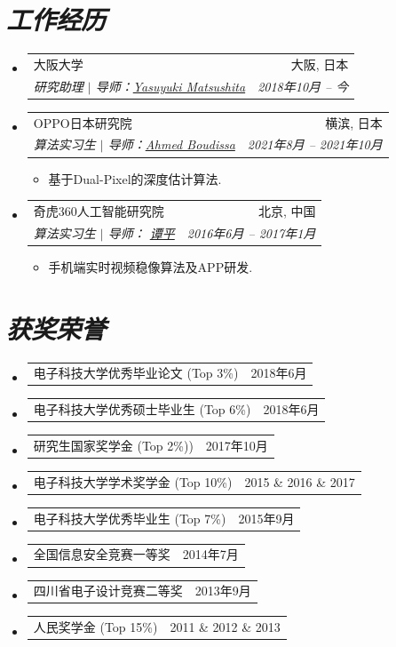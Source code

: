 \documentclass[UTF8]{ctexart}
\makeatletter
\newcommand{\resumeItem}[1]{
	\item\small{
		{#1 \vspace{-2pt}}
	}
}
\newcommand{\resumeSubheading}[4]{
	\vspace{-2pt}\item
	\begin{tabular*}{0.97\textwidth}[t]{l@{\extracolsep{\fill}}r}
		#1 & #2 \\
		\textit{\small#3} & \textit{\small #4} \\
	\end{tabular*}\vspace{-7pt}
}
\newcommand{\resumeProjectHeading}[2]{
	\item
	\begin{tabular*}{0.97\textwidth}{l@{\extracolsep{\fill}}r}
		 #1 & \small #2 \\
	\end{tabular*}\vspace{-7pt}
}
\newcommand{\resumeSubHeadingListStart}{\begin{itemize}[leftmargin=0.15in, label={}]}
\newcommand{\resumeSubHeadingListEnd}{\end{itemize}}
\newcommand{\resumeItemListStart}{\begin{itemize}}
\newcommand{\resumeItemListEnd}{\end{itemize}\vspace{-5pt}}
\makeatother
\begin{document}
	
	\section{\textit{\textbf{工作经历}}}
	\resumeSubHeadingListStart
	\resumeSubheading
	{大阪大学}{大阪, 日本}
	{研究助理 \quad$|$  导师：\href{http://cvl.ist.osaka-u.ac.jp/en/member/matsushita/}{Yasuyuki Matsushita}}{\rm  2018年10月 -- 今}
	\vspace{0.3em}
	\resumeSubheading
	{OPPO日本研究院}{横滨, 日本}
	{算法实习生  $|$ 导师：\href{https://www.linkedin.com/in/ahmedboudissa/?originalSubdomain=jp}{Ahmed Boudissa}}{\rm  2021年8月 -- 2021年10月}
	\resumeItemListStart
	\resumeItem{基于Dual-Pixel的深度估计算法.}
	\resumeItemListEnd
	\vspace{0.3em}
	\resumeSubheading
	{奇虎360人工智能研究院}{北京, 中国}
	{算法实习生 $|$ 导师： \href{https://www.cs.sfu.ca/~pingtan/}{谭平}}{\rm  2016年6月 -- 2017年1月}
	\resumeItemListStart
	\resumeItem{手机端实时视频稳像算法及APP研发.}
	\resumeItemListEnd
	
	\resumeSubHeadingListEnd
	
	\section{\textit{\textbf{获奖荣誉}}}
	\resumeSubHeadingListStart
	\resumeProjectHeading
	{电子科技大学优秀毕业论文 (Top 3\%)}{2018年6月}
	\resumeProjectHeading
	{电子科技大学优秀硕士毕业生 (Top 6\%)}{2018年6月}
	\resumeProjectHeading
	{研究生国家奖学金 (Top 2\%))}{2017年10月}
	\resumeProjectHeading
	{电子科技大学学术奖学金 (Top 10\%)}{2015 \& 2016 \& 2017}
	\resumeProjectHeading
	{电子科技大学优秀毕业生 (Top 7\%)}{2015年9月}
	\resumeProjectHeading
	{全国信息安全竞赛一等奖}{2014年7月}
	\resumeProjectHeading
	{四川省电子设计竞赛二等奖}{2013年9月}
	\resumeProjectHeading
	{人民奖学金 (Top 15\%)}{2011 \& 2012 \& 2013}
	\resumeSubHeadingListEnd
	
\end{document}
